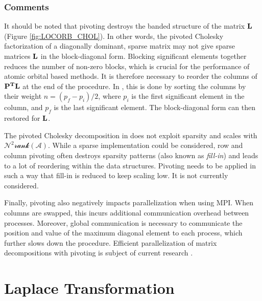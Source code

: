 \subsubsection{Comments}

It should be noted that pivoting destroys the banded structure of the matrix $\mathbf{L}$ (Figure \ref{fig:LOCORB_CHOL}). In other words, the pivoted Cholesky factorization of a diagonally dominant, sparse matrix may not give sparse matrices $\mathbf{L}$ in the block-diagonal form. Blocking significant elements together reduces the number of non-zero blocks, which is crucial for the performance of atomic orbital based methods. It is therefore necessary to reorder the columns of $\mathbf{P^TL}$ at the end of the procedure. In \mchem{}, this is done by sorting the columns by their weight $n = (p_f - p_i) / 2$, where $p_i$ is the first significant element in the column, and $p_f$ is the last significant element. The block-diagonal form can then restored for $\mathbf{L}$. 

The pivoted Cholesky decomposition in \mchem{} does not exploit sparsity and scales with $\mathcal{N^2rank(A)}$. While a sparse implementation could be considered, row and column pivoting often destroys sparsity patterns (also known as \emph{fill-in}) and leads to a lot of reordering within the data structures. Pivoting needs to be applied in such a way that fill-in is reduced to keep scaling low. It is not currently considered.

Finally, pivoting also negatively impacts parallelization when using MPI. When columns are swapped, this incurs additional communication overhead between processes. Moreover, global communication is necessary to communicate the position and value of the maximum diagonal element to each process, which further slows down the procedure. Efficient parallelization of matrix decompositions with pivoting is subject of current research \cite{Xia2016,Xia2017}.

\section{Laplace Transformation \label{sec:LAPLACE}}

